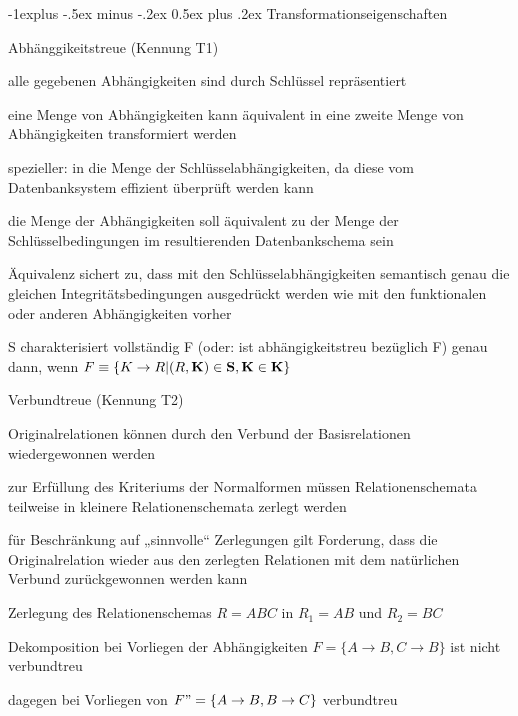 \documentclass[a4paper]{article}
\makeatletter
\renewcommand{\subsection}{\@startsection{subsection}{2}{0mm}%
                                {-1explus -.5ex minus -.2ex}%
                                {0.5ex plus .2ex}%
                                {\normalfont\normalsize\bfseries}}
\makeatother
\begin{document}
\begin{multicols}{3}
    \subsection{Transformationseigenschaften}
    \begin{itemize*}
        \item Abhänggikeitstreue (Kennung T1)
        \begin{itemize*}
            \item alle gegebenen Abhängigkeiten sind durch Schlüssel repräsentiert
            \item eine Menge von Abhängigkeiten kann äquivalent in eine zweite Menge von Abhängigkeiten transformiert werden
            \item spezieller: in die Menge der Schlüsselabhängigkeiten, da diese vom Datenbanksystem effizient überprüft werden kann
            \item die Menge der Abhängigkeiten soll äquivalent zu der Menge der Schlüsselbedingungen im resultierenden Datenbankschema sein
            \item Äquivalenz sichert zu, dass mit den Schlüsselabhängigkeiten semantisch genau die gleichen Integritätsbedingungen ausgedrückt werden wie mit den funktionalen oder anderen Abhängigkeiten vorher
            \item S charakterisiert vollständig F (oder: ist abhängigkeitstreu bezüglich F) genau dann, wenn $F\equiv \{K\rightarrow R | (R,\bf{K})\in S, K\in\bf{K}\}$
        \end{itemize*}
        \item Verbundtreue (Kennung T2)
        \begin{itemize*}
            \item Originalrelationen können durch den Verbund der Basisrelationen wiedergewonnen werden
            \item zur Erfüllung des Kriteriums der Normalformen müssen Relationenschemata teilweise in kleinere Relationenschemata zerlegt werden
            \item für Beschränkung auf „sinnvolle“ Zerlegungen gilt Forderung, dass die Originalrelation wieder aus den zerlegten Relationen mit dem natürlichen Verbund zurückgewonnen werden kann
            \item Zerlegung des Relationenschemas $R = ABC$ in $R_1 = AB$ und $R_2 = BC$
            \item Dekomposition bei Vorliegen der Abhängigkeiten $F = \{A \rightarrow B, C \rightarrow B\}$ ist nicht verbundtreu
            \item dagegen bei Vorliegen von $F" = \{A \rightarrow B, B \rightarrow C\}$ verbundtreu

\end{itemize*}
\end{itemize*}
\end{multicols}
\end{document}

